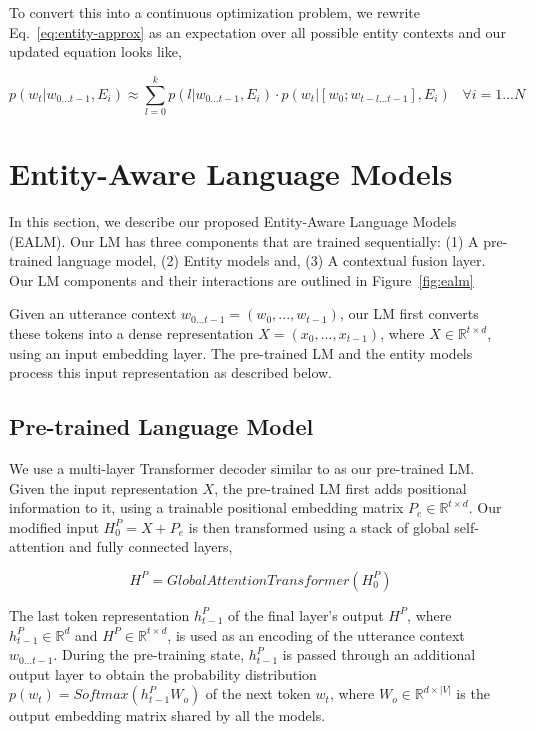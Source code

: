 \documentclass{article}
\begin{document}
To convert this into a continuous optimization problem, we rewrite Eq.~\ref{eq:entity-approx} as an expectation over all possible entity contexts and our updated equation looks like,

\begin{equation}
	\label{eq:entity-models}
	p(w_t|w_{0...t-1}, E_i) \approx \sum_{l=0}^{k} p(l|w_{0...t-1}, E_i) \cdot p(w_t | [w_0; w_{t-l...t-1}], E_i) \;\;\; \forall i = 1...N
\end{equation}



\section{Entity-Aware Language Models}
\label{model}

In this section, we describe our proposed Entity-Aware Language Models (EALM). Our LM has three components that are trained sequentially: (1) A pre-trained language model, (2) Entity models and, (3) A contextual fusion layer.  Our LM components and their interactions are outlined in Figure~\ref{fig:ealm}

Given an utterance context  $w_{0...t-1} = (w_0, ..., w_{t-1})$, our LM first converts these tokens into a dense representation  $X = (x_0, ..., x_{t-1})$, where $X \in \mathbb{R}^{t \times d}$, using an input embedding layer. The pre-trained LM and the entity models process this input representation as described below. 

\subsection{Pre-trained Language Model}

We use a multi-layer Transformer decoder similar to \cite{NIPS2017_3f5ee243, radford2018improving} as our pre-trained LM. Given the input representation $X$, the pre-trained LM first adds positional information to it, using a trainable positional embedding matrix $P_e \in \mathbb{R}^{t \times d}$. Our modified input $H_0^P = X + P_e$ is then transformed using a stack of global self-attention and fully connected layers,

\begin{equation}
	\label{eq:pretrained-lm}
		H^P = GlobalAttentionTransformer(H_0^P)
\end{equation}

The last token representation $h_{t-1}^P$ of the final layer's output $H^P$, where $h_{t-1}^P \in \mathbb{R}^d$ and $H^P \in \mathbb{R}^{t \times d}$, is used as an encoding of the utterance context $w_{0...t-1}$. During the pre-training state, $h_{t-1}^P$ is passed through an additional output layer to obtain the probability distribution $p(w_t) = Softmax(h_{t-1}^PW_o)$ of the next token $w_t$, where $W_o \in \mathbb{R}^{d \times |V|}$ is the output embedding matrix shared by all the models.
\end{document}
